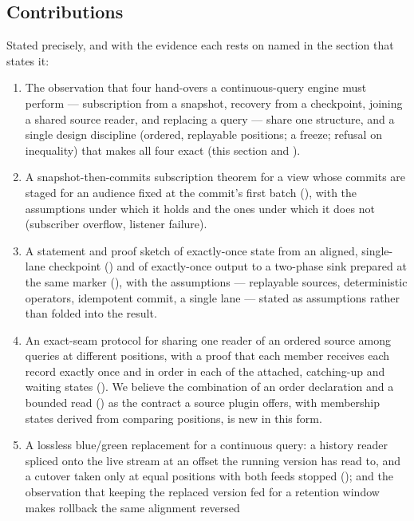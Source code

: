 \documentclass[11pt,a4paper]{article}
\renewcommand{\_}{\oldunderscore\allowbreak}
\newcommand{\code}[1]{\texttt{\pvbreakable{#1}}}
\begin{document}
\subsection{Contributions}

Stated precisely, and with the evidence each rests on named in the section that states it:

\begin{enumerate}[leftmargin=*,itemsep=3pt]
\item The observation that four hand-overs a continuous-query engine must perform --- subscription
      from a snapshot, recovery from a checkpoint, joining a shared source reader, and replacing a
      query --- share one structure, and a single design discipline (ordered, replayable positions;
      a freeze; refusal on inequality) that makes all four exact (this section and
      ).
\item A snapshot-then-commits subscription theorem for a view whose commits are staged for an
      audience fixed at the commit's first batch (), with the assumptions under
      which it holds and the ones under which it does not (subscriber overflow, listener failure).
\item A statement and proof sketch of exactly-once state from an aligned, single-lane checkpoint
      () and of exactly-once output to a two-phase sink prepared at the same marker
      (), with the assumptions --- replayable sources, deterministic operators,
      idempotent commit, a single lane --- stated as assumptions rather than folded into the result.
\item An exact-seam protocol for sharing one reader of an ordered source among queries at different
      positions, with a proof that each member receives each record exactly once and in order in each
      of the attached, catching-up and waiting states (). We believe the combination
      of an order declaration and a bounded read (\code{pollBefore}) as the contract a source plugin
      offers, with membership states derived from comparing positions, is new in this form.
\item A lossless blue/green replacement for a continuous query: a history reader spliced onto the live
      stream at an offset the running version has read to, and a cutover taken only at equal positions
      with both feeds stopped (); and the observation that keeping the
      replaced version fed for a retention window makes rollback the same alignment reversed

\end{enumerate}
\end{document}
